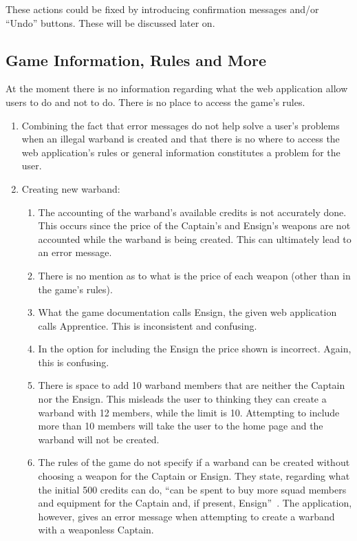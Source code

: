 \documentclass[12pt,a4paper]{article}
\begin{document}
These actions could be fixed by introducing confirmation messages and/or ``Undo'' buttons. These will be discussed later on. 

\subsection{Game Information, Rules and More}

At the moment there is no information regarding what the web application allow users to do and not to do. There is no place to access the game's rules.

\begin{enumerate}
 \item Combining the fact that error messages do not help solve a user's problems when an illegal warband is created and that there is no where to access the web application's rules or general information constitutes a problem for the user. 
 \item Creating new warband:\begin{enumerate}
                             \item The accounting of the warband's available credits is not accurately done. This occurs since the price of the Captain's and Ensign's weapons are not accounted while the warband is being created. This can ultimately lead to an error message.
                             \item There is no mention as to what is the price of each weapon (other than in the game's rules).
                             \item What the game documentation calls Ensign, the given web application calls Apprentice. This is inconsistent and confusing. 
                             \item In the option for including the Ensign the price shown is incorrect. Again, this is confusing.
                             \item There is space to add 10 warband members that are neither the Captain nor the Ensign. This misleads the user to thinking they can create a warband with 12 members, while the limit is 10. Attempting to include more than 10 members will take the user to the home page and the warband will not be created.
                             \item The rules of the game do not specify if a warband can be created without choosing a weapon for the Captain or Ensign. They state, regarding what the initial 500 credits can do, ``can be spent to buy more squad members and equipment for the Captain and, if present, Ensign''~\cite{soft_dev}. The application, however, gives an error message when attempting to create a warband with a weaponless Captain. 

\end{enumerate}
\end{enumerate}
\end{document}
